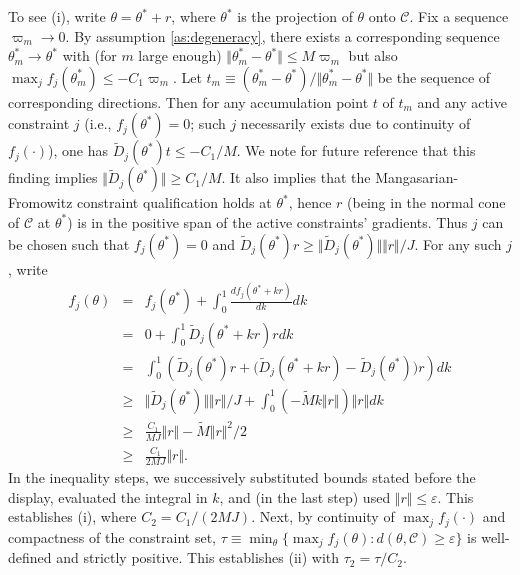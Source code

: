 \documentclass[letterpaper,11pt]{article}
\theoremstyle{myplain}
\theoremstyle{mydefinition}
\theoremstyle{myremark}
\newcommand{\cC}{\mathcal{C}}
\numberwithin{equation}{section}
\numberwithin{figure}{section}
\begin{document}
\begin{appendix}
To see (i), write $\theta=\theta^*+r$, where $\theta^*$ is the projection of $\theta$ onto $\cC$. Fix a sequence $\varpi_m \to 0$. By assumption \ref{as:degeneracy}, there exists a corresponding sequence $\theta^*_m \to \theta^*$ with (for $m$ large enough) $\Vert \theta^*_m - \theta^* \Vert \leq M\varpi_m$ but also $\max_j f_j(\theta^*_m) \leq -C_1 \varpi_m$. Let $t_m \equiv (\theta^*_m - \theta^*)/\Vert \theta^*_m-\theta^* \Vert$ be the sequence of corresponding directions. Then for any accumulation point $t$ of $t_m$ and any active constraint $j$ (i.e., $f_j(\theta^*)=0$; such $j$ necessarily exists due to continuity of $f_j(\cdot)$), one has $\tilde{D}_j(\theta^*)t \leq -C_1/M$.
We note for future reference that this finding implies $\Vert \tilde{D}_j(\theta^*) \Vert \geq C_1/M$. It also implies that the Mangasarian-Fromowitz constraint qualification holds at $\theta^*$, hence $r$ (being in the normal cone of $\cC$ at $\theta^*$) is in the positive span of the active constraints' gradients. Thus $j$ can be chosen such that $f_j(\theta^*)=0$ and $\tilde{D}_j(\theta^*)r \geq \Vert \tilde{D}_j(\theta^*)\Vert \Vert r \Vert / J$. For any such $j$, write
\begin{eqnarray*}
f_j(\theta) &=& f_j(\theta^*)+ \int_0^1 \frac{df_j(\theta^*+kr)}{dk}dk \\
&=& 0+ \int_0^1 \tilde{D}_j(\theta^*+kr)r dk \\
&=& \int_0^1 \left( \tilde{D}_j(\theta^*)r + \bigl(\tilde{D}_j(\theta^*+kr) - \tilde{D}_j(\theta^*)\bigr)r\right) dk \\
&\geq & \Vert\tilde{D}_j(\theta^*)\Vert \Vert r \Vert /J + \int_0^1 (-\tilde{M}k\Vert r \Vert)\Vert r \Vert
dk \\
&\geq &\tfrac{C_1}{MJ} \Vert r \Vert - \tilde{M}\Vert r \Vert^2/2 \\
&\geq &\tfrac{C_1}{2MJ} \Vert r \Vert.
\end{eqnarray*}
In the inequality steps, we successively substituted bounds stated before the display, evaluated the integral in $k$, and (in the last step) used $\Vert r \Vert \leq \varepsilon$. This establishes (i), where $C_2=C_1/(2MJ)$.
Next, by continuity of $\max_j f_j(\cdot)$ and compactness of the constraint set, $\tau \equiv \min_\theta \{\max_j f_j(\theta):d(\theta,\cC) \geq \varepsilon\}$ is well-defined and strictly positive. This establishes (ii) with $\tau_2=\tau/C_2$.



\end{appendix}
\end{document}
